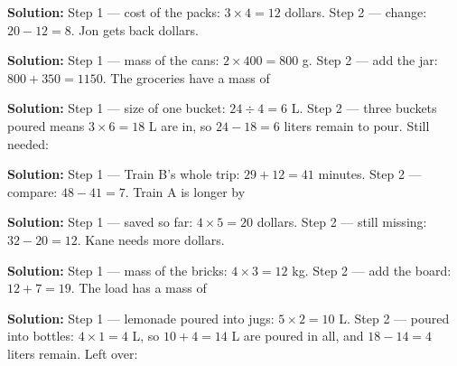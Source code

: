 \documentclass[12pt]{article}
\begin{document}
\textbf{Solution:} Step 1 --- cost of the packs: $3 \times 4 = 12$ dollars.
Step 2 --- change: $20 - 12 = 8$. Jon gets back  dollars.


\textbf{Solution:} Step 1 --- mass of the cans: $2 \times 400 = 800$ g.
Step 2 --- add the jar: $800 + 350 = 1150$. The groceries have a mass of


\textbf{Solution:} Step 1 --- size of one bucket: $24 \div 4 = 6$ L.
Step 2 --- three buckets poured means $3 \times 6 = 18$ L are in, so
$24 - 18 = 6$ liters remain to pour. Still needed: 


\textbf{Solution:} Step 1 --- Train B's whole trip: $29 + 12 = 41$ minutes.
Step 2 --- compare: $48 - 41 = 7$. Train A is longer by 


\textbf{Solution:} Step 1 --- saved so far: $4 \times 5 = 20$ dollars.
Step 2 --- still missing: $32 - 20 = 12$. Kane needs  more dollars.


\textbf{Solution:} Step 1 --- mass of the bricks: $4 \times 3 = 12$ kg.
Step 2 --- add the board: $12 + 7 = 19$. The load has a mass of


\textbf{Solution:} Step 1 --- lemonade poured into jugs: $5 \times 2 = 10$ L.
Step 2 --- poured into bottles: $4 \times 1 = 4$ L, so $10 + 4 = 14$ L are
poured in all, and $18 - 14 = 4$ liters remain. Left over: 
\end{document}
